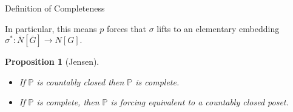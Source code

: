 \documentclass[utf8x,xcolor=svgnames,8pt]{beamer}
\renewcommand{\P}{\mathbb{P}}
\renewcommand{\G}{\overline{G}}
\newcommand{\To}{\longrightarrow}
\newtheorem{proposition}{Proposition}
\begin{document}
\begin{frame}{Definition of Completeness}
\begin{definition}
In particular, this means $p$ forces that $\sigma$ lifts to an elementary embedding $\sigma^*:\overline N[\G] \To N[G].$
\end{definition}

\begin{proposition}[Jensen] \begin{itemize}
	\item If $\P$ is countably closed then $\P$ is complete.
%
	\item If $\P$ is complete, then $\P$ is forcing equivalent to a countably closed poset. 
	\end{itemize}
	\end{proposition}

\end{frame}
\end{document}
